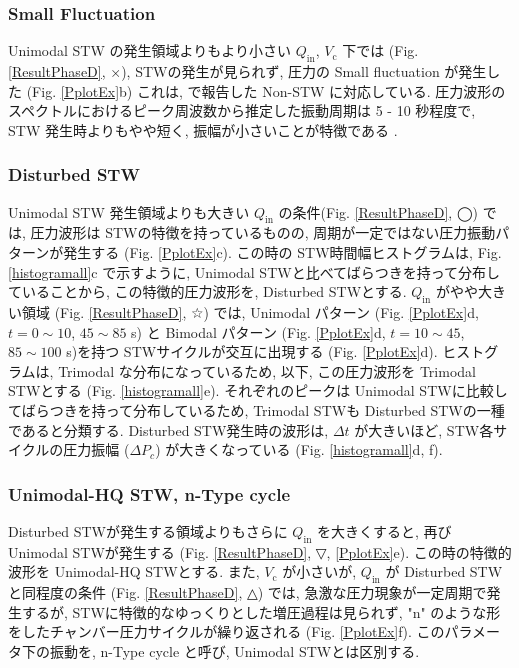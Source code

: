 \documentclass[aps,pre,preprint,groupedaddress,showkeys]{revtex4-2}
\begin{document}
\subsubsection{Small Fluctuation}
Unimodal STW の発生領域よりもより小さい $Q_\mathrm{in}$, $V_\mathrm{c}$ 下では (Fig. \ref{ResultPhaseD}, ×), STWの発生が見られず, 圧力の Small fluctuation が発生した (Fig. \ref{PplotEx}b)  これは, \cite{kanno2018} で報告した Non-STW に対応している. 圧力波形のスペクトルにおけるピーク周波数から推定した振動周期は 5 - 10 秒程度で, STW 発生時よりもやや短く, 振幅が小さいことが特徴である \cite[Fig. 4]{kanno2018}.

\subsubsection{Disturbed STW}
Unimodal STW 発生領域よりも大きい $Q_\mathrm{in}$ の条件(Fig. \ref{ResultPhaseD}, ◯) では, 圧力波形は STWの特徴を持っているものの, 周期が一定ではない圧力振動パターンが発生する (Fig. \ref{PplotEx}c). この時の STW時間幅ヒストグラムは, Fig. \ref{histogramall}c で示すように, Unimodal STWと比べてばらつきを持って分布していることから, この特徴的圧力波形を, Disturbed STWとする.
$Q_\mathrm{in}$ がやや大きい領域 (Fig. \ref{ResultPhaseD}, ☆) では, Unimodal パターン (Fig. \ref{PplotEx}d, $t=0\sim10$, $45\sim85$ s) と Bimodal パターン (Fig. \ref{PplotEx}d, $t=10\sim45$, $85\sim100$ s)を持つ STWサイクルが交互に出現する (Fig. \ref{PplotEx}d). ヒストグラムは, Trimodal な分布になっているため, 以下, この圧力波形を Trimodal STWとする (Fig. \ref{histogramall}e). それぞれのピークは Unimodal STWに比較してばらつきを持って分布しているため, Trimodal STWも Disturbed STWの一種であると分類する. Disturbed STW発生時の波形は, $\Delta t$ が大きいほど, STW各サイクルの圧力振幅 ($\Delta P_c$) が大きくなっている (Fig. \ref{histogramall}d, f).

\subsubsection{Unimodal-HQ STW, n-Type cycle}
Disturbed STWが発生する領域よりもさらに $Q_\mathrm{in}$ を大きくすると, 再び Unimodal STWが発生する (Fig. \ref{ResultPhaseD}, ▽, \ref{PplotEx}e). この時の特徴的波形を Unimodal-HQ STWとする. また, $V_\mathrm{c}$ が小さいが, $Q_\mathrm{in}$ が Disturbed STWと同程度の条件 (Fig. \ref{ResultPhaseD}, △) では, 急激な圧力現象が一定周期で発生するが, STWに特徴的なゆっくりとした増圧過程は見られず, "n" のような形をしたチャンバー圧力サイクルが繰り返される (Fig. \ref{PplotEx}f). このパラメータ下の振動を, n-Type cycle と呼び, Unimodal STWとは区別する. 
\end{document}
